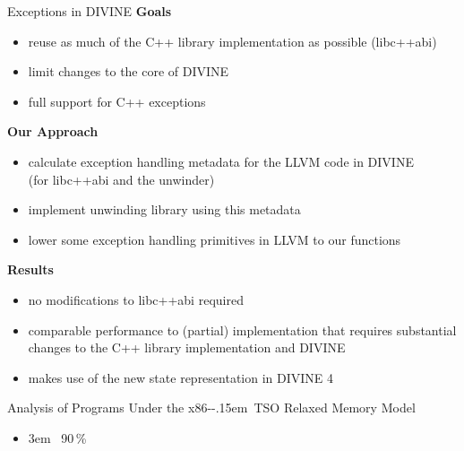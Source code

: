 \documentclass[aspectratio=169, fi]{paradise-slide}
\newcommand{\fcite}[1]{\emergencystretch 3em{\protect\NoHyper\cite{#1}}~\fullcite{#1}}
\newcommand{\xtso}{\mbox{x86-\kern-.15em TSO}\xspace}
\newenvironment{prespart}[1]{%
  \begin{frame}{}%
    \centering
      {\Large #1} \par\bigskip\bigskip%
}{%
  \end{frame}%
}
\begin{document}
\begin{frame}{Exceptions in DIVINE}
  \textbf{Goals}
  \begin{itemize}
    \item reuse as much of the C++ library implementation as possible (libc++abi)
    \item limit changes to the core of DIVINE
    \item full support for C++ exceptions
  \end{itemize}
  \pause

  \bigskip
  \textbf{Our Approach}
  \begin{itemize}
    \item calculate exception handling metadata for the LLVM code in DIVINE\\
      (for libc++abi and the unwinder)
    \item implement unwinding library using this metadata
    \item lower some exception handling primitives in LLVM to our functions
  \end{itemize}
  \pause

  \bigskip
  \textbf{Results}
  \begin{itemize}
    \item no modifications to libc++abi required
    \item comparable performance to (partial) implementation that requires substantial changes to
      the C++ library implementation and DIVINE
    \item makes use of the new state representation in DIVINE 4
  \end{itemize}
\end{frame}

\begin{prespart}{Analysis of Programs Under the \xtso Relaxed Memory Model}
  \begin{itemize}
    \item \fcite{SB2018x86tso} \hfill 90\,\%
  \end{itemize}
\end{prespart}
\end{document}
